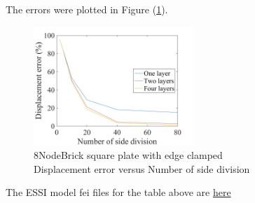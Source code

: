 \documentclass[fleqn,11pt]{article}
\begin{document}
The errors were plotted in Figure (\ref{fig 8NodeBrick square plate with edge clamped}).
\begin{figure}[H]
    \centering
    \includegraphics[width=6cm]{../Figure-files/error8brick_square_plate_clamped.jpeg}
  \captionsetup{justification=centering,margin=3cm}
  \caption{8NodeBrick square plate with edge clamped\\
      Displacement error   versus   Number of side division}
  \label{fig 8NodeBrick square plate with edge clamped}
\end{figure}



The ESSI model fei files for the table above are \href{https://github.com/yuan-energy/ESSI_Verification/blob/master/8NodeBrick/square_plate_clamped/square_plate_clamped.tar.gz?raw=true}{here}















\end{document}
